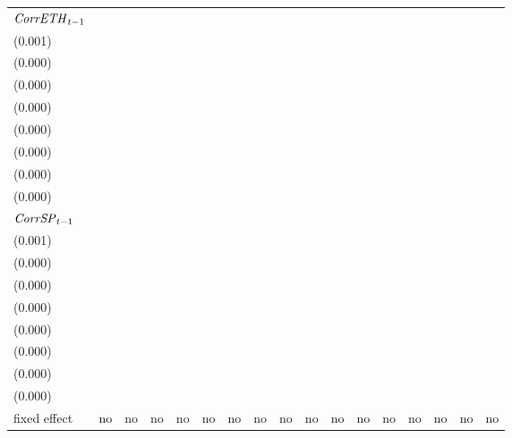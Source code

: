 \begin{tabular}{lllllllllllllllll}
${{\it CorrETH}}_{t-1}$      &    \makecell{$-0.001$^{} \\(0.001)} &                                     &    \makecell{$0.000$^{} \\(0.000)} &                                    &  \makecell{$-0.005$^{**} \\(0.000)} &                                     &    \makecell{$-0.000$^{} \\(0.000)} &                                     &  \makecell{$-0.005$^{**} \\(0.000)} &                                     &  \makecell{$-0.000$^{**} \\(0.000)} &                                     &  \makecell{$-0.002$^{**} \\(0.000)} &                                     &    \makecell{$0.000$^{} \\(0.000)} &                                    \\
${{\it CorrSP}}_{t-1}$       &                                     &  \makecell{$-0.002$^{**} \\(0.001)} &                                    &    \makecell{$0.000$^{} \\(0.000)} &                                     &  \makecell{$-0.007$^{**} \\(0.000)} &                                     &    \makecell{$-0.000$^{} \\(0.000)} &                                     &  \makecell{$-0.007$^{**} \\(0.000)} &                                     &  \makecell{$-0.000$^{**} \\(0.000)} &                                     &  \makecell{$-0.002$^{**} \\(0.000)} &                                    &    \makecell{$0.000$^{} \\(0.000)} \\
fixed effect                 &                                  no &                                  no &                                 no &                                 no &                                  no &                                  no &                                  no &                                  no &                                  no &                                  no &                                  no &                                  no &                                  no &                                  no &                                 no &                                 no \\

\end{tabular}
